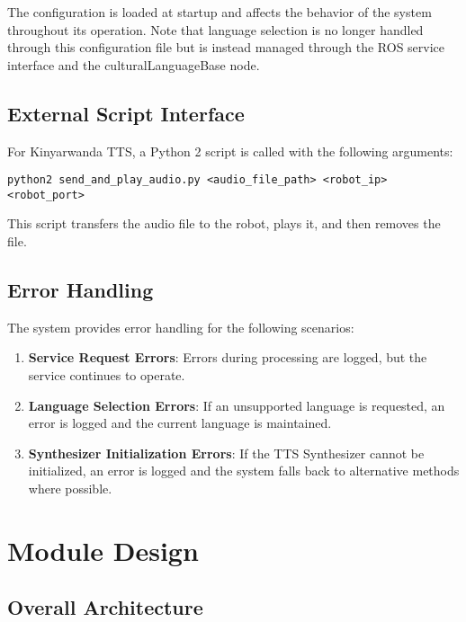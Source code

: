 \documentclass{CSSRforAfrica}
\begin{document}
The configuration is loaded at startup and affects the behavior of the system throughout its operation. Note that language selection is no longer handled through this configuration file but is instead managed through the ROS service interface and the culturalLanguageBase node.

\subsection{External Script Interface}

For Kinyarwanda TTS, a Python 2 script is called with the following arguments:

\begin{lstlisting}[style=commandstyle]
python2 send_and_play_audio.py <audio_file_path> <robot_ip> <robot_port>
\end{lstlisting}

This script transfers the audio file to the robot, plays it, and then removes the file.

\subsection{Error Handling}

The system provides error handling for the following scenarios:

\begin{enumerate}
    \item \textbf{Service Request Errors}: Errors during processing are logged, but the service continues to operate.
    \item \textbf{Language Selection Errors}: If an unsupported language is requested, an error is logged and the current language is maintained.
    \item \textbf{Synthesizer Initialization Errors}: If the TTS Synthesizer cannot be initialized, an error is logged and the system falls back to alternative methods where possible.
\end{enumerate}

\newpage

\section{Module Design}

\subsection{Overall Architecture}
\end{document}
